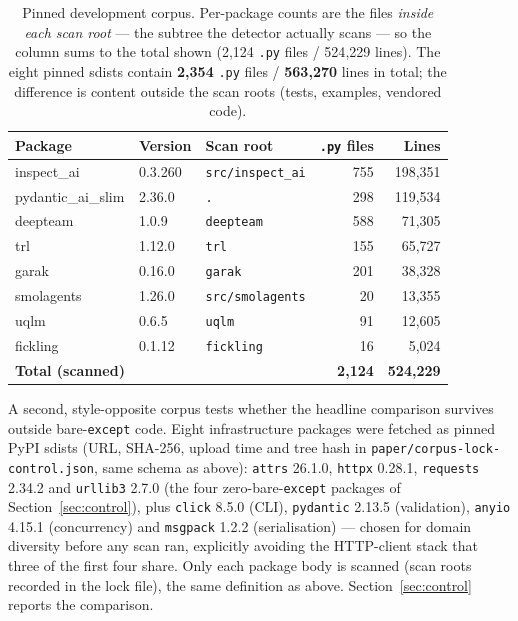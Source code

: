 \documentclass[10pt,a4paper]{article}
\begin{document}
\begin{table}[htbp]
\centering\small
\caption{Pinned development corpus. Per-package counts are the files \emph{inside each scan
root} --- the subtree the detector actually scans --- so the column sums to the
total shown (2{,}124 \texttt{.py} files / 524{,}229 lines). The eight pinned
sdists contain \textbf{2{,}354} \texttt{.py} files / \textbf{563{,}270} lines in
total; the difference is content outside the scan roots (tests, examples,
vendored code).}
\label{tab:corpus}
\begin{tabular}{@{}lllrr@{}}
\toprule
Package & Version & Scan root & \texttt{.py} files & Lines \\
\midrule
inspect\_ai & 0.3.260 & \texttt{src/inspect\_ai} & 755 & 198{,}351 \\
pydantic\_ai\_slim & 2.36.0 & \texttt{.} & 298 & 119{,}534 \\
deepteam & 1.0.9 & \texttt{deepteam} & 588 & 71{,}305 \\
trl & 1.12.0 & \texttt{trl} & 155 & 65{,}727 \\
garak & 0.16.0 & \texttt{garak} & 201 & 38{,}328 \\
smolagents & 1.26.0 & \texttt{src/smolagents} & 20 & 13{,}355 \\
uqlm & 0.6.5 & \texttt{uqlm} & 91 & 12{,}605 \\
fickling & 0.1.12 & \texttt{fickling} & 16 & 5{,}024 \\
\midrule
\textbf{Total (scanned)} & & & \textbf{2{,}124} & \textbf{524{,}229} \\
\bottomrule
\end{tabular}
\end{table}

A second, style-opposite corpus tests whether the headline comparison survives outside bare-\texttt{except} code. Eight infrastructure packages were fetched as pinned PyPI sdists (URL, SHA-256, upload time and tree hash in \texttt{paper/corpus-lock-control.json}, same schema as above): \texttt{attrs} 26.1.0, \texttt{httpx} 0.28.1, \texttt{requests} 2.34.2 and \texttt{urllib3} 2.7.0 (the four zero-bare-\texttt{except} packages of Section~\ref{sec:control}), plus \texttt{click} 8.5.0 (CLI), \texttt{pydantic} 2.13.5 (validation), \texttt{anyio} 4.15.1 (concurrency) and \texttt{msgpack} 1.2.2 (serialisation) --- chosen for domain diversity before any scan ran, explicitly avoiding the HTTP-client stack that three of the first four share. Only each package body is scanned (scan roots recorded in the lock file), the same definition as above. Section~\ref{sec:control} reports the comparison.
\end{document}
